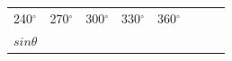\begin{center}
\begin{xtabular*}{\mytablewidth}[t]{|p{10\mystarwidth}|p{10\mystarwidth}|p{10\mystarwidth}|p{10\mystarwidth}|p{10\mystarwidth}|p{10\mystarwidth}|p{10\mystarwidth}|p{10\mystarwidth}|}
    
        240\begin{math}{}^{\circ }\end{math} &
    
    
        270\begin{math}{}^{\circ }\end{math} &
    
    
        300\begin{math}{}^{\circ }\end{math} &
    
    
        330\begin{math}{}^{\circ }\end{math} &
    
    
        360\begin{math}{}^{\circ }\end{math}%
     \tabularnewline{}
    
    
        
                  \begin{math}sin\theta \end{math}
                 &
    

\end{xtabular*}
\end{center}
